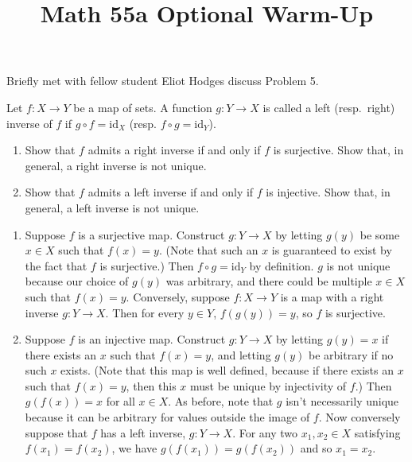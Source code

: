 \documentclass[11pt,letterpaper]{article}
\title{Math 55a Optional Warm-Up}
\begin{document}
\maketitle
\setcounter{page}{0}
\thispagestyle{empty}

\begin{center}
Briefly met with fellow student Eliot Hodges discuss Problem 5.
\end{center}

\pagebreak

\begin{problem}
    Let $f:X\to Y$ be a map of sets. A function $g:Y\to X$ is called a
    left (resp.\ right) inverse of $f$ if $g\circ f=\mathrm{id}_X$ (resp.
    $f\circ g=\mathrm{id}_Y$).

    \begin{enumerate}
        \item Show that $f$ admits a right inverse if and only if $f$ is surjective. Show that, in general, a right inverse is not unique.
        
        \item Show that $f$ admits a left inverse if and only if $f$ is injective. Show that, in general, a left inverse is not unique.
    \end{enumerate}
\end{problem}

\begin{enumerate}
    \item Suppose $f$ is a surjective map. Construct $g : Y \to X$ by letting $g(y)$ be some $x \in X$ such that $f(x)=y$. (Note that such an $x$ is guaranteed to exist by the fact that $f$ is surjective.) Then $f \circ g = \mathrm{id}_Y$ by definition. $g$ is not unique because our choice of $g(y)$ was arbitrary, and there could be multiple $x\in X$ such that $f(x)=y$. Conversely, suppose $f : X \to Y$ is a map with a right inverse $g : Y \to X$. Then for every $y \in Y$, $f(g(y)) = y$, so $f$ is surjective. 
    
    \item Suppose $f$ is an injective map. Construct $g : Y \to X$ by letting $g(y) = x$ if there exists an $x$ such that $f(x)=y$, and letting $g(y)$ be arbitrary if no such $x$ exists. (Note that this map is well defined, because if there exists an $x$ such that $f(x)=y$, then this $x$ must be unique by injectivity of $f$.) Then $g(f(x)) = x$ for all $x\in X$. As before, note that $g$ isn't necessarily unique because it can be arbitrary for values outside the image of $f$. Now conversely suppose that $f$ has a left inverse, $g : Y \to X$. For any two $x_1, x_2 \in X$ satisfying $f(x_1) = f(x_2)$, we have $g(f(x_1)) = g(f(x_2))$ and so $x_1=x_2$. 
\end{enumerate}
\end{document}

